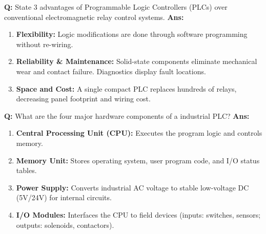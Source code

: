 \documentclass[10pt,a4paper,twocolumn]{article}
\begin{document}
\begin{tcolorbox}[
  colback=white,
  colframe=UnitColorThree,
  colbacktitle=gray!10!white,
  coltitle=black,
  fonttitle=\bfseries\sffamily\small,
  title={Unit III $\bullet$ Card 1: PLC vs. Relay Control Panels},
  boxrule=1.2pt,
  arc=2mm,
  outer arc=2mm,
  boxsep=1.5mm,
  top=1mm,
  bottom=1mm,
  left=1.5mm,
  right=1.5mm,
  before skip=2.5mm,
  after skip=2.5mm
]
\textbf{Q:} State 3 advantages of Programmable Logic Controllers (PLCs) over conventional electromagnetic relay control systems.
\tcbline
\textbf{Ans:} \begin{enumerate}
  \item \textbf{Flexibility:} Logic modifications are done through software programming without re-wiring.
  \item \textbf{Reliability \& Maintenance:} Solid-state components eliminate mechanical wear and contact failure. Diagnostics display fault locations.
  \item \textbf{Space and Cost:} A single compact PLC replaces hundreds of relays, decreasing panel footprint and wiring cost.
\end{enumerate}
\end{tcolorbox}


\begin{tcolorbox}[
  colback=white,
  colframe=UnitColorThree,
  colbacktitle=gray!10!white,
  coltitle=black,
  fonttitle=\bfseries\sffamily\small,
  title={Unit III $\bullet$ Card 2: PLC Hardware Architecture},
  boxrule=1.2pt,
  arc=2mm,
  outer arc=2mm,
  boxsep=1.5mm,
  top=1mm,
  bottom=1mm,
  left=1.5mm,
  right=1.5mm,
  before skip=2.5mm,
  after skip=2.5mm
]
\textbf{Q:} What are the four major hardware components of a industrial PLC?
\tcbline
\textbf{Ans:} \begin{enumerate}
  \item \textbf{Central Processing Unit (CPU):} Executes the program logic and controls memory.
  \item \textbf{Memory Unit:} Stores operating system, user program code, and I/O status tables.
  \item \textbf{Power Supply:} Converts industrial AC voltage to stable low-voltage DC (5V/24V) for internal circuits.
  \item \textbf{I/O Modules:} Interfaces the CPU to field devices (inputs: switches, sensors; outputs: solenoids, contactors).
\end{enumerate}
\end{tcolorbox}
\end{document}
